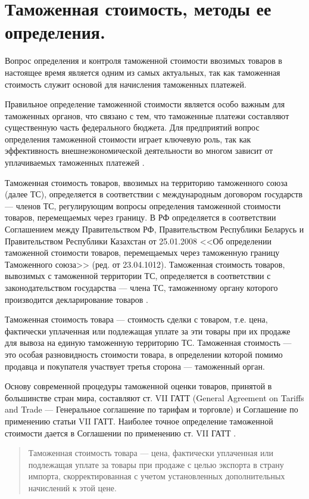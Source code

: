 \section{Таможенная стоимость, методы ее определения.}

Вопрос определения и контроля таможенной стоимости ввозимых товаров в настоящее время является одним из самых актуальных, так как таможенная стоимость служит основой для начисления таможенных платежей.

Правильное определение таможенной стоимости является особо важным для таможенных органов, что связано с тем, что таможенные платежи составляют существенную часть федерального бюджета. Для предприятий вопрос определения таможенной стоимости играет ключевую роль, так как эффективность внешнеэкономической деятельности во многом зависит от уплачиваемых таможенных платежей \cite[с. 249--250]{mahovikova}.

Таможенная стоимость товаров, ввозимых на территорию таможенного союза (далее ТС), определяется в соответствии с международным договором государств --- членов ТС, регулирующим вопросы определения таможенной стоимости товаров, перемещаемых через границу. В РФ определяется в соответствии Соглашением между Правительством РФ, Правительством Республики Беларусь и Правительством Республики Казахстан от 25.01.2008 <<Об определении таможенной стоимости товаров, перемещаемых через таможенную границу Таможенного союза>> (ред. от 23.04.1012). Таможенная стоимость товаров, вывозимых с таможенной территории ТС, определяется в соответствии с законодательством государства --- члена ТС, таможенному органу которого производится декларирование товаров \cite[с. 486]{tolkushkin}.

Таможенная стоимость товара --- стоимость сделки с товаром, т.е. цена, фактически уплаченная или подлежащая уплате за эти товары при их продаже для вывоза на единую  таможенную территорию ТС. Таможенная стоимость --- это особая разновидность стоимости товара, в определении которой помимо продавца и покупателя участвует третья сторона --- таможенный орган.

Основу современной процедуры таможенной оценки товаров, принятой в большинстве стран мира, составляют ст. VII ГАТТ (General Agreement on Tariffs and Trade --- Генеральное соглашение по тарифам и торговле) и Соглашение по применению статьи VII ГАТТ. Наиболее точное определение таможенной стоимости дается в Соглашении по применению ст. VII ГАТТ \cite[с. 124]{novikova}.
\begin{quote}
	Таможенная стоимость товара --- цена, фактически уплаченная или подлежащая уплате за товары при продаже с целью экспорта в страну импорта, скорректированная с учетом установленных дополнительных начислений к этой цене.
\end{quote}

